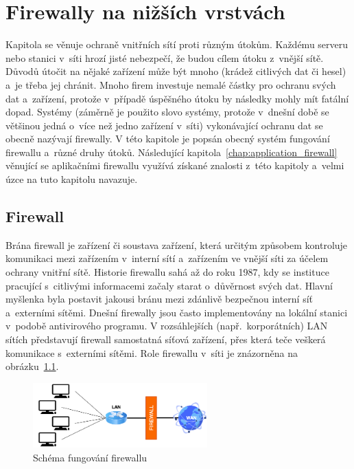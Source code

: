 \chapter{Firewally na nižších vrstvách}
\label{chap:network_protection}
Kapitola se věnuje ochraně vnitřních sítí proti různým útokům. Každému serveru nebo stanici v~síti hrozí jisté nebezpečí, že budou cílem útoku z~vnější sítě. Důvodů útočit na nějaké zařízení může být mnoho (krádež citlivých dat či hesel) a~je třeba jej chránit. Mnoho firem investuje nemalé částky pro ochranu svých dat a~zařízení, protože v~případě úspěšného útoku by následky mohly mít fatální dopad. Systémy (záměrně je použito slovo systémy, protože v~dnešní době se většinou jedná o~více než jedno zařízení v~síti) vykonávající ochranu dat se obecně nazývají firewally. V této kapitole je popsán obecný systém fungování firewallu a~různé druhy útoků. Následující kapitola~\ref{chap:application_firewall} věnující se aplikačními firewallu využívá získané znalosti z~této kapitoly a~velmi úzce na tuto kapitolu navazuje.

\section{Firewall}
Brána firewall je zařízení či soustava zařízení, která určitým způsobem kontroluje komunikaci mezi zařízením v~interní sítí a~zařízením ve vnější síti za účelem ochrany vnitřní sítě. Historie firewallu sahá až do roku 1987, kdy se instituce pracující s~citlivými informacemi začaly starat o~důvěrnost svých dat. Hlavní myšlenka byla postavit jakousi bránu mezi zdánlivě bezpečnou interní síť a~externími sítěmi. Dnešní firewally jsou často implementovány na lokální stanici v~podobě antivirového programu. V rozsáhlejších (např.~korporátních) LAN sítích představují firewall samostatná síťová zařízení, přes která teče veškerá komunikace s~externími sítěmi. Role firewallu v~síti je znázorněna na obrázku~\ref{img:firewall}.

\begin{figure}[hbt]
	\centering
	\includegraphics[width=0.6\textwidth]{images/firewall.png}
	\caption{Schéma fungování firewallu}
	\label{img:firewall}
\end{figure}


